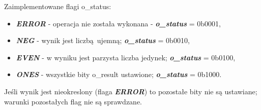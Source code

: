 Zaimplementowane flagi o\_status:

\begin{itemize}
	\item \emph{\textbf{ERROR}} - operacja nie została wykonana - \textbf{\emph{o\_status}} = 0b0001,
	\item \emph{\textbf{NEG}} - wynik jest liczbą ujemną; \textbf{\emph{o\_status}} = 0b0010,
	\item \emph{\textbf{EVEN}} - w wyniku jest parzysta liczba jedynek; \textbf{\emph{o\_status}} = 0b0100,
	\item \emph{\textbf{ONES}} - wszystkie bity o\_result ustawione; \textbf{\emph{o\_status}} = 0b1000.
\end{itemize}

\noindent
Jeśli wynik jest nieokreslony (flaga \emph{\textbf{ERROR}}) to pozostałe bity nie są ustawiane; warunki pozostałych flag nie są sprawdzane.